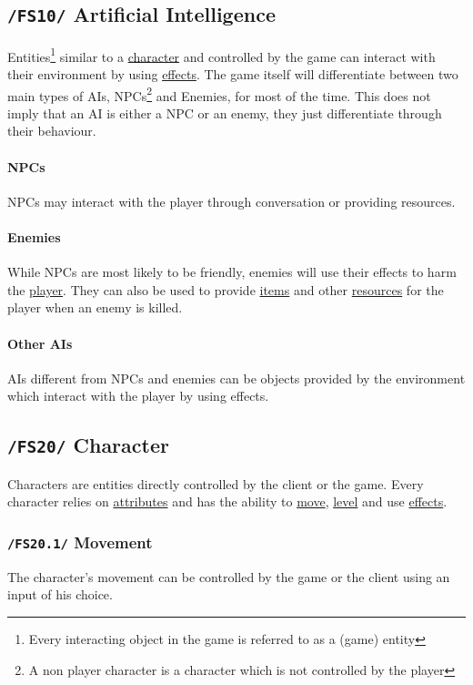 \documentclass[11pt]{article}
\begin{document}
\subsection{\texttt{/FS10/} Artificial Intelligence}\label{subsec:fs10ai}
Entities\footnote{Every interacting object in the game is referred to as a (game) entity} similar to a \hyperref[subsec:fs20character]{character} and controlled by the game can interact with their environment by using \hyperref[subsec:fs30effects]{effects}.
The game itself will differentiate between two main types of AIs, NPCs\footnote{A non player character is a character which is not controlled by the player} and Enemies, for most of the time. 
This does not imply that an AI is either a NPC or an enemy, they just differentiate through their behaviour.
\paragraph{NPCs}
NPCs may interact with the player through conversation or providing resources.
\paragraph{Enemies}
While NPCs are most likely to be friendly, enemies will use their effects to harm the \hyperref[subsec:fs60player]{player}.
They can also be used to provide \hyperref[subsec:fs41items]{items} and other \hyperref[subsec:fs40resources]{resources} for the player when an enemy is killed.
\paragraph{Other AIs}
AIs different from NPCs and enemies can be objects provided by the environment which interact with the player by using effects.
\subsection{\texttt{/FS20/} Character}\label{subsec:fs20character}
Characters are entities directly controlled by the client or the game. 
Every character relies on \hyperref[subsec:fs50attributes]{attributes} and has the ability to \hyperref[subsec:fs201movement]{move}, \hyperref[subsec:fs202levelling]{level} and use \hyperref[subsec:fs30effects]{effects}.
\subsubsection{\texttt{/FS20.1/} Movement}\label{subsec:fs201movement}
The character's movement can be controlled by the game or the client using an input of his choice.
\end{document}
